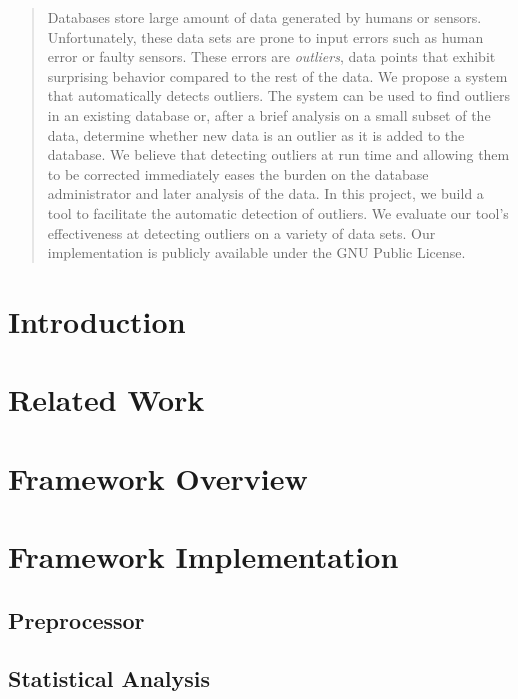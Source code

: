 \documentclass{vldb}
\begin{document}
\maketitle

\begin{abstract}
Databases store large amount of data generated by humans or sensors.
Unfortunately, these data sets are prone to input errors such as human error or faulty sensors.
These errors are \emph{outliers}, data points that exhibit surprising behavior compared to the rest of the data.
We propose a system that automatically detects outliers.
The system can be used to find outliers in an existing database or, after a brief analysis on a small subset of the data, determine whether new data is an outlier as it is added to the database.
We believe that detecting outliers at run time and allowing them to be corrected immediately eases the burden on the database administrator and later analysis of the data.
In this project, we build a tool to facilitate the automatic detection of outliers.
We evaluate our tool's effectiveness at detecting outliers on a variety of data sets.
Our implementation is publicly available under the GNU Public License.
\end{abstract}

\section{Introduction}
\label{sec:intro}

\section{Related Work}
\label{sec:related_work}


\section{Framework Overview}
\label{sec:overview}

\section{Framework Implementation}
\subsection{Preprocessor}
\label{sec:preproc}

\subsection{Statistical Analysis}
\label{sec:stat_anal}

\end{document}
